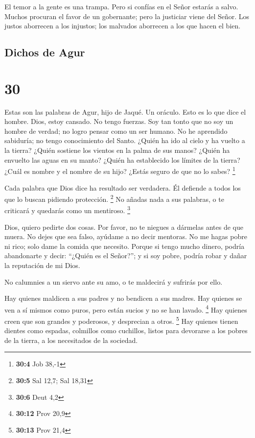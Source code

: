  El temor a la gente es una trampa. Pero si confías en el
Señor estarás a salvo.  Muchos procuran el favor de un
gobernante; pero la justiciar viene del Señor.  Los justos
aborrecen a los injustos; los malvados aborrecen a los que hacen el
bien.

\hypertarget{dichos-de-agur}{%
\subsection{Dichos de Agur}\label{dichos-de-agur}}

\hypertarget{section-29}{%
\section{30}\label{section-29}}

 Estas son las palabras de Agur, hijo de Jaqué. Un oráculo.
Esto es lo que dice el hombre. Dios, estoy cansado. No tengo fuerzas.
 Soy tan tonto que no soy un hombre de verdad; no logro
pensar como un ser humano.  No he aprendido sabiduría; no
tengo conocimiento del Santo.  ¿Quién ha ido al cielo y ha
vuelto a la tierra? ¿Quién sostiene los vientos en la palma de sus
manos? ¿Quién ha envuelto las aguas en su manto? ¿Quién ha establecido
los límites de la tierra? ¿Cuál es nombre y el nombre de su hijo? ¿Estás
seguro de que no lo sabes? \footnote{\textbf{30:4} Job 38,-1}

 Cada palabra que Dios dice ha resultado ser verdadera. Él
defiende a todos los que lo buscan pidiendo protección. \footnote{\textbf{30:5}
  Sal 12,7; Sal 18,31}  No añadas nada a sus palabras, o te
criticará y quedarás como un mentiroso. \footnote{\textbf{30:6} Deut 4,2}

 Dios, quiero pedirte dos cosas. Por favor, no te niegues a
dármelas antes de que muera.  No dejes que sea falso,
ayúdame a no decir mentoras. No me hagas pobre ni rico; solo dame la
comida que necesito.  Porque si tengo mucho dinero, podría
abandonarte y decir: ``¿Quién es el Señor?''; y si soy pobre, podría
robar y dañar la reputación de mi Dios.

 No calumnies a un siervo ante su amo, o te maldecirá y
sufrirás por ello.

 Hay quienes maldicen a sus padres y no bendicen a sus
madres.  Hay quienes se ven a sí mismos como puros, pero
están sucios y no se han lavado. \footnote{\textbf{30:12} Prov 20,9}
 Hay quienes creen que son grandes y poderosos, y
desprecian a otros. \footnote{\textbf{30:13} Prov 21,4} 
Hay quienes tienen dientes como espadas, colmillos como cuchillos,
listos para devorarse a los pobres de la tierra, a los necesitados de la
sociedad.

